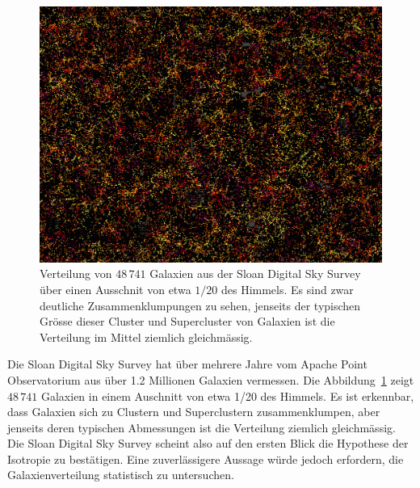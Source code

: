\begin{figure}
\centering
\includegraphics[width=\hsize]{chapters/images/cmass.png}
\caption{Verteilung von $48\,741$ Galaxien aus der Sloan Digital
Sky Survey \cite{skript:cmass} über einen Ausschnit von etwa
$1/20$ des Himmels.
Es sind zwar deutliche Zusammenklumpungen zu sehen, jenseits der
typischen Grösse dieser Cluster und Supercluster von Galaxien
ist die Verteilung im Mittel ziemlich gleichmässig.
\label{skript:robertson:cmass}}
\end{figure}

Die Sloan Digital Sky Survey \cite{skript:sdss} hat über mehrere
%
Jahre vom Apache Point Observatorium aus über 1.2 Millionen Galaxien
vermessen.
Die Abbildung~\ref{skript:robertson:cmass} zeigt $48\,741$ Galaxien in
einem Auschnitt von etwa 1/20 des Himmels.
Es ist erkennbar, dass Galaxien sich zu Clustern und Superclustern
zusammenklumpen, aber jenseits deren typischen Abmessungen ist die
Verteilung ziemlich gleichmässig.
Die Sloan Digital Sky Survey scheint also auf den ersten Blick
die Hypothese der Isotropie zu bestätigen.
Eine zuverlässigere Aussage würde jedoch erfordern, die Galaxienverteilung
statistisch zu untersuchen.

